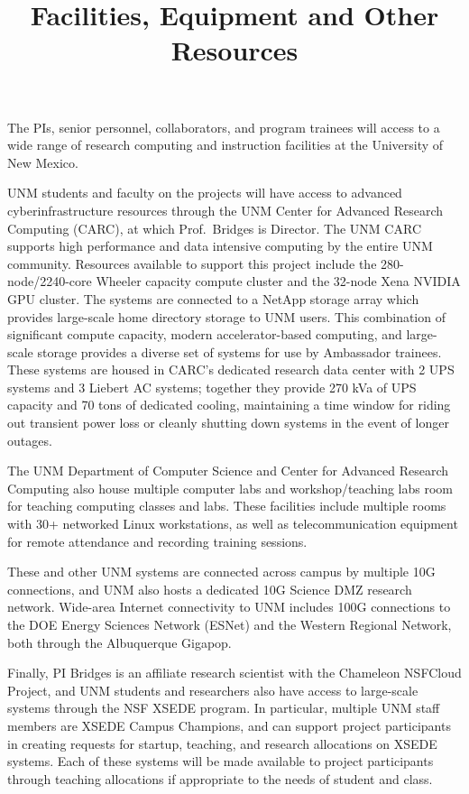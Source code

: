 \documentclass[11pt]{article}
\begin{document}
\title{Facilities, Equipment and Other Resources}
\author{}
\date{}

\maketitle

The PIs, senior personnel, collaborators, and program trainees will access to a wide range of research computing and instruction facilities at the University of New Mexico.

UNM students and faculty on the projects will have access to advanced cyberinfrastructure 
resources through the UNM Center for Advanced Research Computing (CARC),
at which Prof.~Bridges is Director.
The UNM CARC supports high performance and data intensive computing by the entire UNM community. Resources available to support this project include the 280-node/2240-core Wheeler capacity compute cluster and the 32-node Xena NVIDIA GPU cluster. The systems are connected to a NetApp storage array which provides large-scale home directory storage to UNM users. This combination of significant compute capacity, modern accelerator-based computing, and large-scale storage provides a diverse set of systems for use by Ambassador trainees. These systems are housed in CARC's dedicated research data center with 2 UPS systems and 3 Liebert AC systems; together they provide 270 kVa of UPS capacity and 70 tons of dedicated cooling, maintaining a time window for riding out transient power loss or cleanly shutting down systems in the event of longer outages.

The UNM Department of Computer Science and Center for Advanced Research Computing also house multiple computer labs and workshop/teaching labs room for teaching computing classes and labs. These facilities include multiple rooms with 30+ networked Linux workstations, as well as telecommunication equipment for remote attendance and recording training sessions.

These and other UNM systems are connected across campus by multiple 10G connections, and UNM also hosts a dedicated 10G Science DMZ research network. Wide-area Internet connectivity to UNM includes 100G connections to the DOE Energy Sciences Network (ESNet) and the Western Regional Network, both through the Albuquerque Gigapop.

Finally, PI Bridges is an affiliate research scientist with the Chameleon NSFCloud Project, and UNM students and researchers also have access to large-scale systems through the NSF XSEDE program. In particular, multiple UNM staff members are XSEDE Campus Champions, and can support project participants in creating requests for startup, teaching, and research allocations on XSEDE systems. Each of these systems will be made available to project participants through teaching allocations if appropriate to the needs of student and class.
\end{document}

